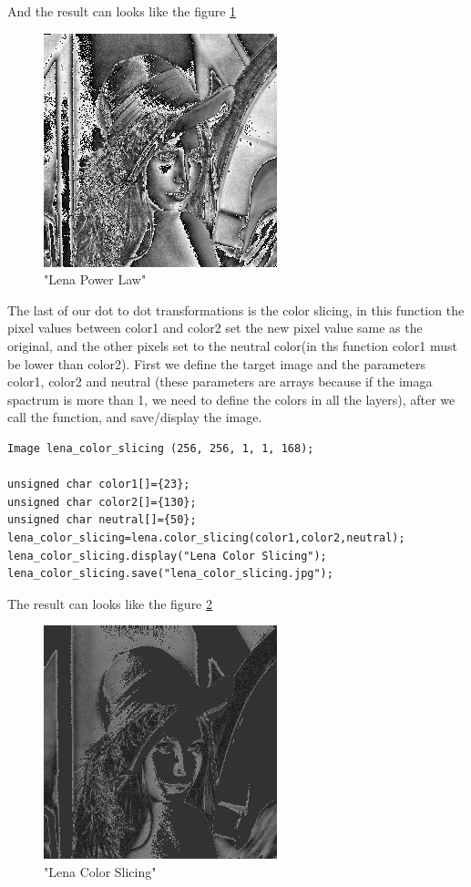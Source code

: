 \documentclass[a4paper]{article}
\begin{document}
And the result can looks like the figure
\ref{lena_pow}


\begin{figure}[H]

\centering
\includegraphics[scale=0.5]{./.Multimedia/lena_power_law.jpg}

\caption{"Lena Power Law"}
\label{lena_pow}
\end{figure}

The last of our dot to dot transformations is the color slicing, in this function the pixel values between  color1 and color2 set the new pixel value same as the original, and the other pixels set to the neutral color(in ths function color1 must be lower than color2). First we define the target image and the parameters color1, color2 and neutral (these parameters are arrays because if the imaga spactrum is more than 1, we need to define the colors in all the layers), after we call the function, and save/display the image.

\begin{lstlisting}
Image lena_color_slicing (256, 256, 1, 1, 168);
		
unsigned char color1[]={23};
unsigned char color2[]={130};
unsigned char neutral[]={50};
lena_color_slicing=lena.color_slicing(color1,color2,neutral);
lena_color_slicing.display("Lena Color Slicing");
lena_color_slicing.save("lena_color_slicing.jpg");
\end{lstlisting}

The result can looks like the figure
\ref{lena_color_slicing}


\begin{figure}[H]

\centering
\includegraphics[scale=0.5]{./.Multimedia/lena_color_slicing.jpg}

\caption{"Lena Color Slicing"}
\label{lena_color_slicing}
\end{figure}
\end{document}
